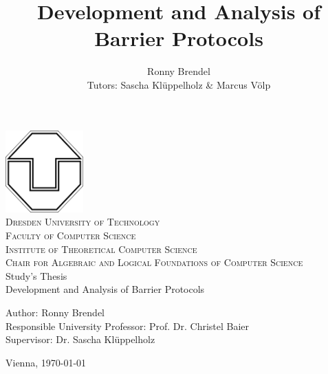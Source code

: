 \documentclass[a4paper, 10pt]{article}
\title{Development and Analysis of Barrier Protocols}
\author{Ronny Brendel\\Tutors: Sascha Kl\"uppelholz \& Marcus V\"olp}
\begin{document}
\begin{titlepage}

\begin{center}
\includegraphics[width=3cm]{tu-logo}~\\[1cm]
\textsc{\LARGE Dresden University of Technology}\\[0.5cm]
\textsc{\Large Faculty of Computer Science}\\[0.2cm]
\textsc{\large Institute of Theoretical Computer Science}\\[0.2cm]
\textsc{\large Chair for Algebraic and Logical Foundations of Computer Science}\\[3cm]
\Huge Study's Thesis \\[1cm]
\huge Development and Analysis of Barrier Protocols\\[3cm]
\end{center}

\vfill
\begin{flushleft} \large
	Author: Ronny Brendel \\
	Responsible University Professor: Prof. Dr. Christel Baier \\
	Supervisor: Dr. Sascha Kl\"uppelholz
\end{flushleft}
\vspace{0.2cm}
\begin{flushright}
	\large Vienna, \today
\end{flushright}

\end{titlepage}

\pagebreak
\newpage \thispagestyle{empty} \mbox{}
\pagebreak

\thispagestyle{empty}
\end{document}
